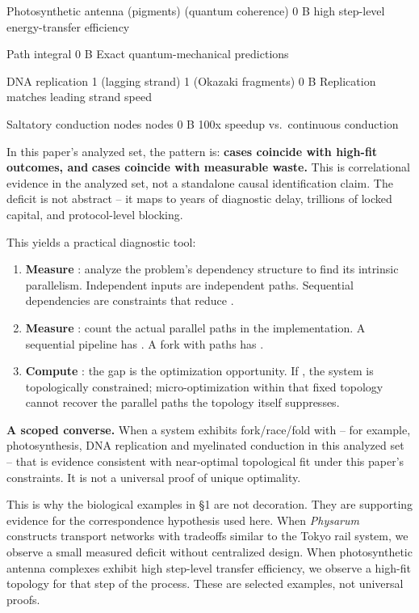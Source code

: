 \documentclass[
]{article}
\providecommand{\tightlist}{%
  \setlength{\itemsep}{0pt}\setlength{\parskip}{0pt}}
\begin{document}
Photosynthetic antenna \textbar{} (pigments) \textbar{} (quantum
coherence) \textbar{} 0 B \textbar{} high step-level energy-transfer
efficiency \textbar{}

Path integral \textbar{} \textbar{} \textbar{} 0 B \textbar{} Exact
quantum-mechanical predictions \textbar{}

DNA replication \textbar{} 1 (lagging strand) \textbar{} 1 (Okazaki
fragments) \textbar{} 0 B \textbar{} Replication matches leading strand
speed \textbar{}

Saltatory conduction \textbar{} nodes \textbar{} nodes \textbar{} 0 B
\textbar{} 100x speedup vs.~continuous conduction \textbar{}

In this paper's analyzed set, the pattern is: \textbf{cases coincide
with high-fit outcomes, and} \textbf{cases coincide with measurable
waste.} This is correlational evidence in the analyzed set, not a
standalone causal identification claim. The deficit is not abstract --
it maps to years of diagnostic delay, trillions of locked capital, and
protocol-level blocking.

This yields a practical diagnostic tool:

\begin{enumerate}
\def\labelenumi{\arabic{enumi}.}
\tightlist
\item
  \textbf{Measure} : analyze the problem's dependency structure to find
  its intrinsic parallelism. Independent inputs are independent paths.
  Sequential dependencies are constraints that reduce .\\
\item
  \textbf{Measure} : count the actual parallel paths in the
  implementation. A sequential pipeline has . A fork with paths has .\\
\item
  \textbf{Compute} : the gap is the optimization opportunity. If , the
  system is topologically constrained; micro-optimization within that
  fixed topology cannot recover the parallel paths the topology itself
  suppresses.
\end{enumerate}

\textbf{A scoped converse.} When a system exhibits fork/race/fold with
-- for example, photosynthesis, DNA replication and myelinated
conduction in this analyzed set -- that is evidence consistent with
near-optimal topological fit under this paper's constraints. It is not a
universal proof of unique optimality.

This is why the biological examples in §1 are not decoration. They are
supporting evidence for the correspondence hypothesis used here. When
\emph{Physarum} constructs transport networks with tradeoffs similar to
the Tokyo rail system, we observe a small measured deficit without
centralized design. When photosynthetic antenna complexes exhibit high
step-level transfer efficiency, we observe a high-fit topology for that
step of the process. These are selected examples, not universal proofs.
\end{document}
